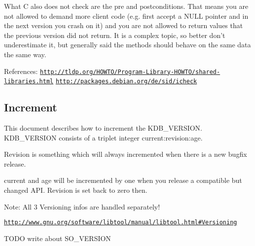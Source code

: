 What C also does not check are the pre and postconditions. That means you are not allowed to demand more client code (e.\+g. first accept a N\+U\+L\+L pointer and in the next version you crash on it) and you are not allowed to return values that the previous version did not return. It is a complex topic, so better don't underestimate it, but generally said the methods should behave on the same data the same way.

References\+: \href{http://tldp.org/HOWTO/Program-Library-HOWTO/shared-libraries.html}{\tt http\+://tldp.\+org/\+H\+O\+W\+T\+O/\+Program-\/\+Library-\/\+H\+O\+W\+T\+O/shared-\/libraries.\+html} \href{http://packages.debian.org/de/sid/icheck}{\tt http\+://packages.\+debian.\+org/de/sid/icheck}

\subsection*{Increment}

This document describes how to increment the K\+D\+B\+\_\+\+V\+E\+R\+S\+I\+O\+N. K\+D\+B\+\_\+\+V\+E\+R\+S\+I\+O\+N consists of a triplet integer current\+:revision\+:age.

Revision is something which will always incremented when there is a new bugfix release.

current and age will be incremented by one when you release a compatible but changed A\+P\+I. Revision is set back to zero then.

Note\+: All 3 Versioning infos are handled separately!

\href{http://www.gnu.org/software/libtool/manual/libtool.html#Versioning}{\tt http\+://www.\+gnu.\+org/software/libtool/manual/libtool.\+html\#\+Versioning}

T\+O\+D\+O write about S\+O\+\_\+\+V\+E\+R\+S\+I\+O\+N 
